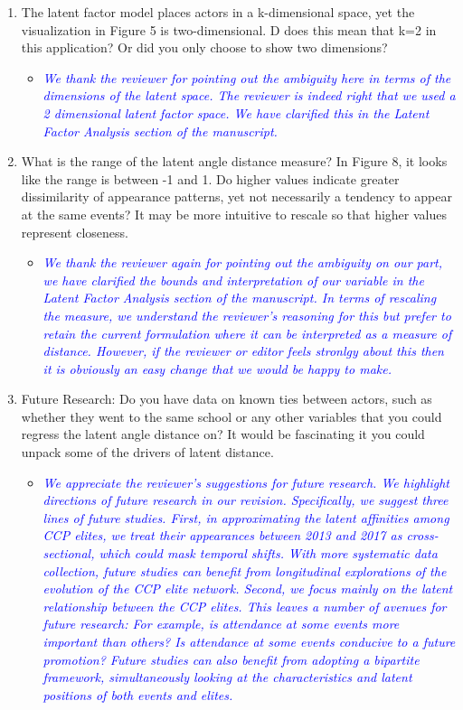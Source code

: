 \begin{enumerate}
	\item The latent factor model places actors in a k-dimensional space, yet the visualization in Figure 5 is two-dimensional. D does this mean that k=2 in this application? Or did you only choose to show two dimensions?
	\begin{itemize}
		\item \textcolor{blue}{ \emph{
			We thank the reviewer for pointing out the ambiguity here in terms of the dimensions of the latent space. The reviewer is indeed right that we used a 2 dimensional latent factor space. We have clarified this in the Latent Factor Analysis section of the manuscript.
		}}
	\end{itemize}
	\item What is the range of the latent angle distance measure? In Figure 8, it looks like the range is between -1 and 1. Do higher values indicate greater dissimilarity of appearance patterns, yet not necessarily a tendency to appear at the same events?  It may be more intuitive to rescale so that higher values represent closeness.
	\begin{itemize}
		\item \textcolor{blue}{ \emph{
			We thank the reviewer again for pointing out the ambiguity on our part, we have clarified the bounds and interpretation of our variable in the Latent Factor Analysis section of the manuscript. In terms of rescaling the measure, we understand the reviewer's reasoning for this but prefer to retain the current formulation where it can be interpreted as a measure of distance. However, if the reviewer or editor feels stronlgy about this then it is obviously an easy change that we would be happy to make.
		}}
	\end{itemize}
	\item Future Research: Do you have data on known ties between actors, such as whether they went to the same school or any other variables that you could regress the latent angle distance on?  It would be fascinating it you could unpack some of the drivers of latent distance.
	\begin{itemize}
		\item \textcolor{blue}{ \emph{
			We appreciate the reviewer's suggestions for future research.  We highlight directions of future research in our revision.  Specifically, we suggest three lines of future studies.  First, in approximating the latent affinities among CCP elites, we treat their appearances between 2013 and 2017 as cross-sectional, which could mask temporal shifts.  With more systematic data collection, future studies can benefit from longitudinal explorations of the evolution of the CCP elite network.  Second, we focus mainly on the latent relationship between the CCP elites.  This leaves a number of avenues for future research:  For example, is attendance at some events more important than others?  Is attendance at some events conducive to a future promotion?  Future studies can also benefit from adopting a bipartite framework, simultaneously looking at the characteristics and latent positions of both events and elites.
		}}
	\end{itemize}
\end{enumerate}
